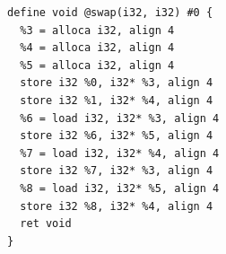 \documentclass{jarticle}
\begin{document}
\begin{Verbatim}
define void @swap(i32, i32) #0 {
  %3 = alloca i32, align 4
  %4 = alloca i32, align 4
  %5 = alloca i32, align 4
  store i32 %0, i32* %3, align 4
  store i32 %1, i32* %4, align 4
  %6 = load i32, i32* %3, align 4
  store i32 %6, i32* %5, align 4
  %7 = load i32, i32* %4, align 4
  store i32 %7, i32* %3, align 4
  %8 = load i32, i32* %5, align 4
  store i32 %8, i32* %4, align 4
  ret void
}
\end{Verbatim}
\end{document}
